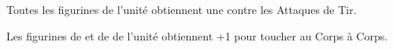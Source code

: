 \startpricelist

 Toutes les figurines de l'unité obtiennent une  contre les Attaques de Tir. 

 Les figurines de \barrowknights{} et de \barrowguards{} de l'unité obtiennent +1 pour toucher au Corps à Corps.

\endpricelist

\closearmymagicalitems














\quickrefsheettitle


\bigskip
\begin{center}\end{center}

\newcommand{\QRSinvoctable}[2]{%
\rowcolors{1}{white}{black!10}
\noindent\begin{tabular}{p{4cm}>{\centering\let\newline\\\arraybackslash\hspace{0pt}}p{1cm}@{}}%
\antiquefont\Large{\textbf{#1\spacebeforecolon{}:}}&\vspace*{-0.2cm}%
\DTLforeach*[#2]{profiles}{\rowname=name, \rowtrooptype=trooptype, \rowcategory=category, \rowinvocation=invocation}{%
\tabularnewline\rowname{} & \rowinvocation{}}%
\tabularnewline%
\end{tabular}
\medskip
}

